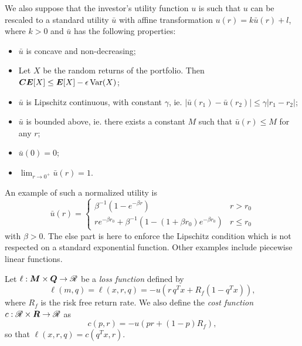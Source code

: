 \documentclass[11pt]{article}
\begin{document}
\begin{assumption}
  We also suppose that the investor's utility function $u$ is such that $u$ can be
  rescaled to a standard utility $\bar u$ with affine transformation
  $u(r) = k\bar u(r) + l$, where $k>0$ and $\bar u$ has the following properties:
  \begin{itemize}
  \item $\bar u$ is concave and non-decreasing;
  \item Let $X$ be the random returns of the portfolio. Then
    $\bm{CE}[X] \leq \bm E[X] - \epsilon \operatorname{Var}(X)$;
  \item $\bar u$ is Lipschitz continuous, with constant $\gamma$, ie.
    $|\bar u(r_1) - \bar u(r_2)| \leq \gamma|r_1-r_2|$;
  \item $\bar u$ is bounded above, ie. there exists a constant $M$ such that $\bar
    u(r)\leq M$ for any $r$;
  \item $\bar u(0) = 0$;
  \item $\lim_{r\to 0^{+}} \bar u(r) = 1$.
  \end{itemize}

  An example of such a normalized utility is 
  \begin{equation*}
    \bar u(r) = \begin{cases}
      \beta^{-1}(1-e^{-\beta r}) & r > r_0\\
      re^{-\beta r_0} + \beta^{-1}(1-(1+\beta r_0)e^{-\beta r_0}) & r \leq r_0
    \end{cases}
  \end{equation*}
  with $\beta>0$. The else part is here to enforce the Lipschitz condition which is not
  respected on a standard exponential function. Other examples include piecewise linear
  functions.
\end{assumption}

\begin{deff}
  Let $\ell:\bm M\times \bm Q\to\mathscr{R}$ be a \textsl{loss function} defined by
  \begin{equation*}
    \ell(m,q) = \ell(x,r,q) = -u(r\,q^{T}x + R_f (1 - q^{T}x)),
  \end{equation*}
  where $R_f$ is the risk free return rate. We also define the \textsl{cost function}
  $c:\mathscr{R}\times\bm R\to\mathscr{R}$ as
  \begin{equation*}
    c(p,r) = -u(pr + (1-p)R_f),
  \end{equation*}
  so that $\ell(x,r,q) = c(q^Tx,r)$. 
\end{deff}
\end{document}

